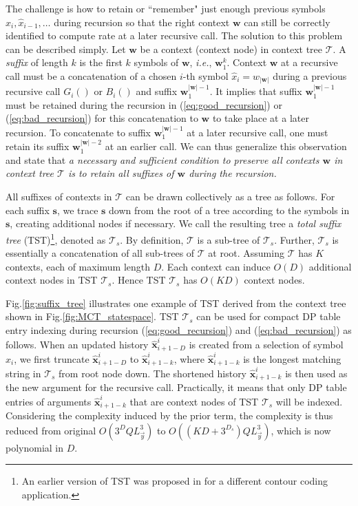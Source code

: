 The challenge is how to retain or ``remember" just enough previous symbols $\hat{x}_{i}, \hat{x}_{i-1}, \ldots$ during recursion so that the right context $\mathbf{w}$ can still be correctly identified to compute rate at a later recursive call.
The solution to this problem can be described simply.
Let $\mathbf{w}$ be a context (context node) in context tree $\mathcal{T}$.
A \textit{suffix} of length $k$ is the first $k$ symbols of $\mathbf{w}$, \textit{i.e.}, $\mathbf{w}^k_1$.
Context $\mathbf{w}$ at a recursive call must be a concatenation of a chosen $i$-th symbol $\hat{x}_i = w_{|\mathbf{w}|}$ during a previous recursive call $G_i()$ or $B_i()$ and suffix $\mathbf{w}^{|\mathbf{w}|-1}_1$.
It implies that suffix $\mathbf{w}^{|\mathbf{w}|-1}_1$ must be retained during the recursion in (\ref{eq:good_recursion}) or (\ref{eq:bad_recursion}) for this concatenation to $\mathbf{w}$ to take place at a later recursion.
To concatenate to suffix $\mathbf{w}^{|\mathbf{w}|-1}_1$ at a later recursive call, one must retain its suffix $\mathbf{w}^{|\mathbf{w}|-2}_1$ at an earlier call.
We can thus generalize this observation and state that \textit{a necessary and sufficient condition to preserve all contexts $\mathbf{w}$ in context tree $\mathcal{T}$ is to retain all suffixes of $\mathbf{w}$ during the recursion.}

All suffixes of contexts in $\mathcal{T}$ can be drawn collectively as a tree as follows. 
For each suffix $\mathbf{s}$, we trace $\mathbf{s}$ down from the root of a tree according to the symbols in $\mathbf{s}$, creating additional nodes if necessary. 
We call the resulting tree a \textit{total suffix tree} (TST)\footnote{An earlier version of TST was proposed in \cite{zheng17} for a different contour coding application.}, denoted as $\mathcal{T}_s$.
By definition, $\mathcal{T}$ is a sub-tree of $\mathcal{T}_s$.
Further, $\mathcal{T}_s$ is essentially a concatenation of all sub-trees of $\mathcal{T}$ at root. 
Assuming $\mathcal{T}$ has $K$ contexts, each of maximum length $D$. 
Each context can induce $O(D)$ additional context nodes in TST $\mathcal{T}_s$. 
Hence TST $\mathcal{T}_s$ has $O(K D)$ context nodes.

Fig.\;\ref{fig:suffix_tree} illustrates one example of TST derived from the context tree shown in Fig.\;\ref{fig:MCT_statespace}.
TST $\mathcal{T}_s$ can be used for compact DP table entry indexing during recursion (\ref{eq:good_recursion}) and (\ref{eq:bad_recursion}) as follows. 
When an updated history $\hat{\mathbf{x}}_{i+1-D}^{i}$ is created from a selection of symbol $\hat{x}_i$, we first truncate $\hat{\mathbf{x}}_{i+1-D}^{i}$ to $\hat{\mathbf{x}}_{i+1-k}^{i}$, where $\hat{\mathbf{x}}_{i+1-k}^{i}$ is the longest matching string in $\mathcal{T}_s$ from root node down. 
The shortened history $\hat{\mathbf{x}}_{i+1-k}^{i}$ is then used as the new argument for the recursive call.
Practically, it means that only DP table entries of arguments $\hat{\mathbf{x}}_{i+1-k}^i$ that are context nodes of TST $\mathcal{T}_s$ will be indexed.
Considering the complexity induced by the prior term, the complexity is thus reduced from original $O(3^D Q L_{\vec{y}}^3)$ to $O( (K D+ 3^{D_s}) Q L_{\vec{y}}^3)$, which is now polynomial in $D$.